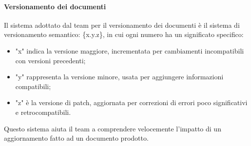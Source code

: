 \documentclass[10pt]{article}
\begin{document}
\begin{justify}
        \paragraph{Versionamento dei documenti}
        Il sistema adottato dal team per il versionamento dei documenti è il sistema di versionamento semantico: \{x.y.z\}, in cui ogni numero ha un significato specifico:\\
        \begin{itemize}
            \item "x" indica la versione maggiore, incrementata per cambiamenti incompatibili con versioni precedenti;
            \item "y" rappresenta la versione minore, usata per aggiungere informazioni compatibili;
            \item "z" è la versione di patch, aggiornata per correzioni di errori poco significativi e retrocompatibili.
        \end{itemize}
        Questo sistema aiuta il team a comprendere velocemente l'impatto di un aggiornamento fatto ad un documento prodotto.\\


\end{justify}
\end{document}
